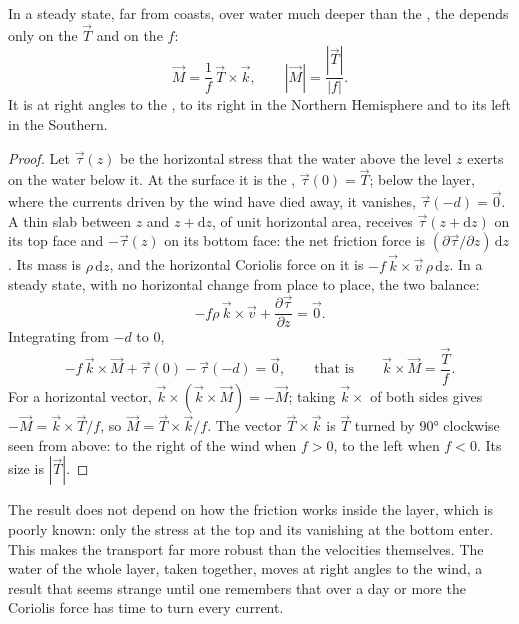 \begin{theorem}\label{thm:b1:ocean-circulation:ekman}
In a steady state, far from coasts, over water much deeper than the , the
 depends only on the  $\vec T$ and on the  $f$:
\[
  \vec M = \frac{1}{f}\,\vec T\times\vec k,
  \qquad |\vec M| = \frac{|\vec T|}{|f|}.
\]
It is at right angles to the , to its right in the Northern Hemisphere
and to its left in the Southern.
\end{theorem}

\begin{proof}
Let $\vec\tau(z)$ be the horizontal stress that the water above the level $z$
exerts on the water below it. At the surface it is the , $\vec\tau(0) =
\vec T$; below the layer, where the currents driven by the wind have died away, it
vanishes, $\vec\tau(-d) = \vec 0$. A thin slab between $z$ and $z + \mathrm dz$, of
unit horizontal area, receives $\vec\tau(z + \mathrm dz)$ on its top face and
$-\vec\tau(z)$ on its bottom face: the net friction force is $(\partial\vec
\tau/\partial z)\,\mathrm dz$. Its mass is $\rho\,\mathrm dz$, and the horizontal
Coriolis force on it is $-f\,\vec k\times\vec v\,\rho\,\mathrm dz$. In a steady
state, with no horizontal change from place to place, the two balance:
\[
  -f\rho\,\vec k\times\vec v + \frac{\partial\vec\tau}{\partial z} = \vec 0 .
\]
Integrating from $-d$ to $0$,
\[
  -f\,\vec k\times\vec M + \vec\tau(0) - \vec\tau(-d) = \vec 0,
  \qquad\text{that is}\qquad \vec k\times\vec M = \frac{\vec T}{f}.
\]
For a horizontal vector, $\vec k\times(\vec k\times\vec M) = -\vec M$; taking
$\vec k\times$ of both sides gives $-\vec M = \vec k\times\vec T/f$, so $\vec M =
\vec T\times\vec k/f$. The vector $\vec T\times\vec k$ is $\vec T$ turned by
\ang{90} clockwise seen from above: to the right of the wind when $f > 0$, to the
left when $f < 0$. Its size is $|\vec T|$.
\end{proof}

The result does not depend on how the friction works inside the layer, which is
poorly known: only the stress at the top and its vanishing at the bottom enter.
This makes the transport far more robust than the velocities themselves. The water
of the whole layer, taken together, moves at right angles to the wind, a result that
seems strange until one remembers that over a day or more the Coriolis force has
time to turn every current.

